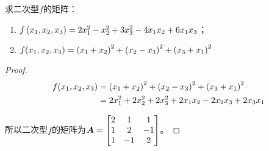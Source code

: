 \begin{problem}
求二次型\(f\)的矩阵：
\begin{enumerate}
    \item \(f\left( x_1,x_2,x_3 \right)=2x_1^2-x_2^2+3x_3^2-4x_1x_2+6x_1x_3\)；
    \item \(f(x_1,x_2,x_3)=\left( x_1+x_2 \right)^2+\left( x_2-x_3 \right)^2+\left( x_3+x_1 \right)^2\)
\end{enumerate}
\end{problem}
\begin{proof}
    \begin{align*}
        f(x_1,x_2,x_3) & =\left( x_1+x_2 \right)^2+\left( x_2-x_3 \right)^2+\left( x_3+x_1 \right)^2 \\
                       & =2x_1^2+2x_2^2+2x_3^2+2x_1x_2-2x_2x_3+2x_3x_1
    \end{align*}

    所以二次型\(f\)的矩阵为\(\boldsymbol{A}=\begin{bmatrix}2&1&1\\1&2&-1\\1&-1&2\end{bmatrix}\)。
\end{proof}

